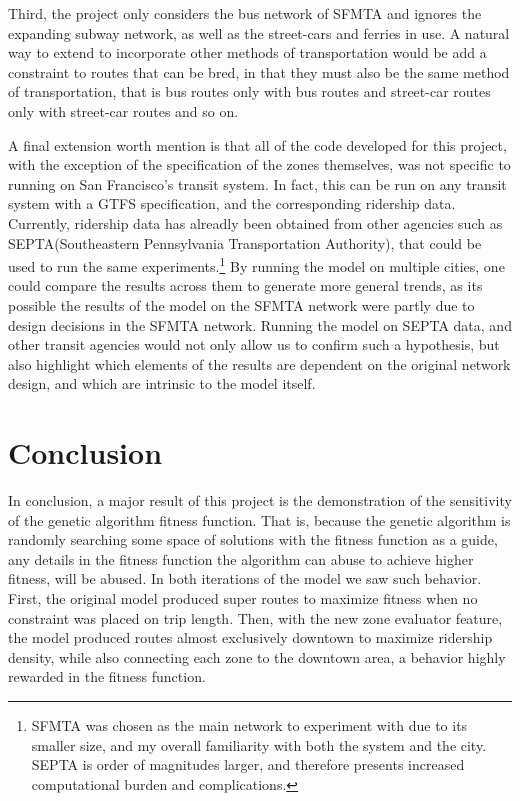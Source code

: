 \documentclass[11pt]{amsart}
\theoremstyle{definition}                  %
\theoremstyle{remark}                       %
\numberwithin{equation}{section}
\begin{document}
Third, the project only considers the bus network of SFMTA and ignores the expanding subway network, as well as the street-cars and ferries in use. A natural way to extend to incorporate other methods of transportation would be add a constraint to routes that can be bred, in that they must also be the same method of transportation, that is bus routes only with bus routes and street-car routes only with street-car routes and so on.   

A final extension worth mention is that all of the code developed for this project, with the exception of the specification of the zones themselves, was not specific to running on San Francisco's transit system. In fact, this can be run on any transit system with a GTFS specification, and the corresponding ridership data. Currently, ridership data has alreadly been obtained from other agencies such as SEPTA(Southeastern Pennsylvania Transportation Authority), that could be used to run the same experiments.\footnote{SFMTA was chosen as the main network to experiment with due to its smaller size, and my overall familiarity with both the system and the city. SEPTA is order of magnitudes larger, and therefore presents increased computational burden and complications.} By running the model on multiple cities, one could compare the results across them to generate more general trends, as its possible the results of the model on the SFMTA network were partly due to design decisions in the SFMTA network. Running the model on SEPTA data, and other transit agencies would not only allow us to confirm such a hypothesis, but also highlight which elements of the results are dependent on the original network design, and which are intrinsic to the model itself. 

\section{Conclusion}
In conclusion, a major result of this project is the demonstration of the sensitivity of the genetic algorithm fitness function. That is, because the genetic algorithm is randomly searching some space of solutions with the fitness function as a guide, any details in the fitness function the algorithm can abuse to achieve higher fitness, will be abused. In both iterations of the model we saw such behavior. First, the original model produced super routes to maximize fitness when no constraint was placed on trip length. Then, with the new zone evaluator feature, the model produced routes almost exclusively downtown to maximize ridership density, while also connecting each zone to the downtown area, a behavior highly rewarded in the fitness function. 
\end{document}
